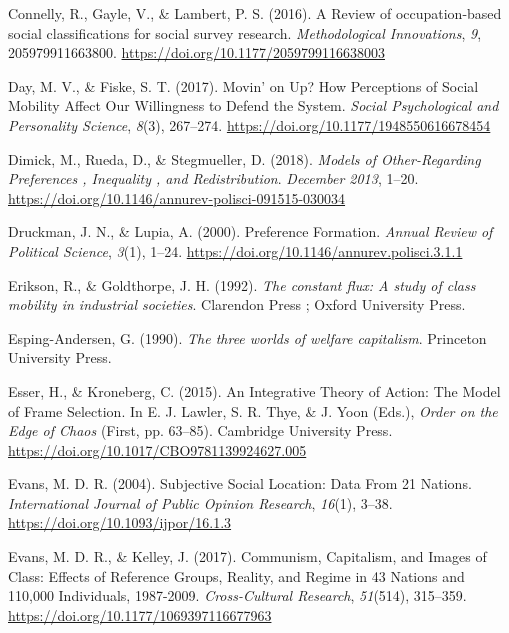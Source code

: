 \documentclass[
  12pt,
]{book}
\newlength{\cslhangindent}
\newlength{\cslentryspacingunit} %
\newenvironment{CSLReferences}[2] %
 {%
  \setlength{\parindent}{0pt}
  \ifodd #1
  \let\oldpar\par
  \def\par{\hangindent=\cslhangindent\oldpar}
  \fi
  \setlength{\parskip}{#2\cslentryspacingunit}
 }%
 {}
\begin{document}
\begin{CSLReferences}{1}{0}
\leavevmode{}%
Connelly, R., Gayle, V., \& Lambert, P. S. (2016). A {Review} of occupation-based social classifications for social survey research. \emph{Methodological Innovations}, \emph{9}, 205979911663800. \url{https://doi.org/10.1177/2059799116638003}

\leavevmode{}%
Day, M. V., \& Fiske, S. T. (2017). Movin' on {Up}? {How Perceptions} of {Social Mobility Affect Our Willingness} to {Defend} the {System}. \emph{Social Psychological and Personality Science}, \emph{8}(3), 267--274. \url{https://doi.org/10.1177/1948550616678454}

\leavevmode{}%
Dimick, M., Rueda, D., \& Stegmueller, D. (2018). \emph{Models of {Other-Regarding Preferences} , {Inequality} , and {Redistribution}}. \emph{December 2013}, 1--20. \url{https://doi.org/10.1146/annurev-polisci-091515-030034}

\leavevmode{}%
Druckman, J. N., \& Lupia, A. (2000). Preference {Formation}. \emph{Annual Review of Political Science}, \emph{3}(1), 1--24. \url{https://doi.org/10.1146/annurev.polisci.3.1.1}

\leavevmode{}%
Erikson, R., \& Goldthorpe, J. H. (1992). \emph{The constant flux: A study of class mobility in industrial societies}. {Clarendon Press ; Oxford University Press}.

\leavevmode{}%
Esping-Andersen, G. (1990). \emph{The three worlds of welfare capitalism}. {Princeton University Press}.

\leavevmode{}%
Esser, H., \& Kroneberg, C. (2015). An {Integrative Theory} of {Action}: {The Model} of {Frame Selection}. In E. J. Lawler, S. R. Thye, \& J. Yoon (Eds.), \emph{Order on the {Edge} of {Chaos}} (First, pp. 63--85). {Cambridge University Press}. \url{https://doi.org/10.1017/CBO9781139924627.005}

\leavevmode{}%
Evans, M. D. R. (2004). Subjective {Social Location}: {Data From} 21 {Nations}. \emph{International Journal of Public Opinion Research}, \emph{16}(1), 3--38. \url{https://doi.org/10.1093/ijpor/16.1.3}

\leavevmode{}%
Evans, M. D. R., \& Kelley, J. (2017). Communism, {Capitalism}, and {Images} of {Class}: {Effects} of {Reference Groups}, {Reality}, and {Regime} in 43 {Nations} and 110,000 {Individuals}, 1987-2009. \emph{Cross-Cultural Research}, \emph{51}(514), 315--359. \url{https://doi.org/10.1177/1069397116677963}


\end{CSLReferences}
\end{document}
